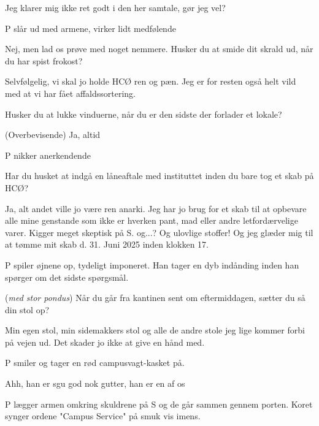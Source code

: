 \documentclass[a4paper,11pt]{article}
\begin{document}
\begin{sketch}
 Jeg klarer mig ikke ret godt i den her samtale, gør jeg vel?

\scene P slår ud med armene, virker lidt medfølende

 Nej, men lad os prøve med noget nemmere. Husker du at smide dit skrald ud, når du har spist frokost?

 Selvfølgelig, vi skal jo holde HCØ ren og pæn. Jeg er for resten også helt vild med at vi har fået affaldssortering. 

 Husker du at lukke vinduerne, når du er den sidste der forlader et lokale?

 (Overbevisende) Ja, altid

\scene P nikker anerkendende

 Har du husket at indgå en låneaftale med instituttet inden du bare tog et skab på HCØ?

 Ja, alt andet ville jo være ren anarki. Jeg har jo brug for et skab til at opbevare alle mine genstande som ikke er hverken pant, mad eller andre letfordærvelige varer.
 Kigger meget skeptisk på S.
 og...?
 Og ulovlige stoffer! Og jeg glæder mig til at tømme mit skab d. 31. Juni 2025 inden klokken 17.

\scene P spiler øjnene op, tydeligt imponeret. Han tager en dyb indånding inden han spørger om det sidste spørgsmål.

 (\textit{med stor pondus}) Når du går fra kantinen sent om eftermiddagen, sætter du så din stol op?

 Min egen stol, min sidemakkers stol og alle de andre stole jeg lige kommer forbi på vejen ud. Det skader jo ikke at give en hånd med.

\scene P smiler og tager en rød campusvagt-kasket på. 

 Ahh, han er sgu god nok gutter, han er en af os

\scene P lægger armen omkring skuldrene på S og de går sammen gennem porten. Koret synger ordene "Campus Service" på smuk vis imens.



\end{sketch}
\end{document}
